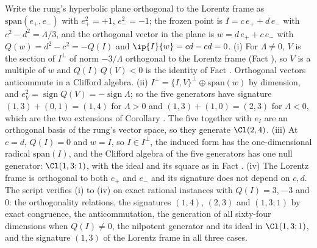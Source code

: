 Write the rung's hyperbolic plane orthogonal to the Lorentz frame as $\mathrm{span}(e_{+}, e_{-})$ with $e_{+}^{2} = +1$, $e_{-}^{2} = -1$; the frozen point is $I = c\,e_{+} + d\,e_{-}$ with $c^{2} - d^{2} = \Lambda/3$, and the orthogonal vector in the plane is $w = d\,e_{+} + c\,e_{-}$ with $Q(w) = d^{2} - c^{2} = -Q(I)$ and $\ip{I}{w} = cd - cd = 0$. (i) For $\Lambda \neq 0$, $V$ is the section of $I^{\perp}$ of norm $-3/\Lambda$ orthogonal to the Lorentz frame (Fact ), so $V$ is a multiple of $w$ and $Q(I)\,Q(V) < 0$ is the identity of Fact . Orthogonal vectors anticommute in a Clifford algebra. (ii) $I^{\perp} = \{I,V\}^{\perp} \oplus \mathrm{span}(w)$ by dimension, and $e_{V}^{2} = \operatorname{sign}Q(V) = -\operatorname{sign}\Lambda$; so the five generators have signature $(1,3) + (0,1) = (1,4)$ for $\Lambda > 0$ and $(1,3) + (1,0) = (2,3)$ for $\Lambda < 0$, which are the two extensions of Corollary . The five together with $e_{I}$ are an orthogonal basis of the rung's vector space, so they generate $\Cl(2,4)$. (iii) At $c = d$, $Q(I) = 0$ and $w = I$, so $I \in I^{\perp}$, the induced form has the one-dimensional radical $\mathrm{span}(I)$, and the Clifford algebra of the five generators has one null generator: $\Cl(1,3;1)$, with the ideal and its square as in Fact . (iv) The Lorentz frame is orthogonal to both $e_{+}$ and $e_{-}$ and its signature does not depend on $c, d$. The script verifies (i) to (iv) on exact rational instances with $Q(I) = 3$, $-3$ and $0$: the orthogonality relations, the signatures $(1,4)$, $(2,3)$ and $(1,3;1)$ by exact congruence, the anticommutation, the generation of all sixty-four dimensions when $Q(I) \neq 0$, the nilpotent generator and its ideal in $\Cl(1,3;1)$, and the signature $(1,3)$ of the Lorentz frame in all three cases.
